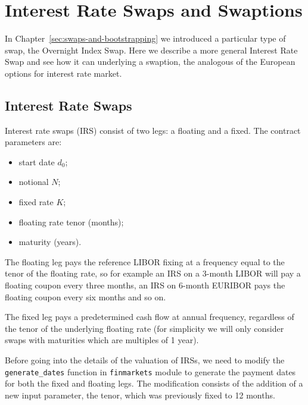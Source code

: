 \chapter{Interest Rate Swaps and Swaptions}
\label{interest-rate-swaps-and-swaptions}

In Chapter~\ref{sec:swaps-and-bootstrapping} we introduced a particular type of swap, the Overnight Index Swap. Here we describe a more general Interest Rate Swap and see how it can underlying a swaption, the analogous of the European options for interest rate market.

\section{Interest Rate Swaps}\label{interest-rate-swaps}

Interest rate swaps (IRS) consist of two legs: a floating and a fixed. The contract parameters are:

\begin{itemize}
\tightlist
\item
  start date \(d_0\);
\item
  notional \(N\);
\item
  fixed rate \(K\);
\item
  floating rate tenor (months);
\item
  maturity (years).
\end{itemize}

The floating leg pays the reference LIBOR fixing at a frequency equal to the tenor of the floating rate, so for example an IRS on a 3-month LIBOR will pay a floating coupon every three months, an IRS on 6-month EURIBOR pays the floating coupon every six months and so on.

The fixed leg pays a predetermined cash flow at annual frequency, regardless of the tenor of the underlying floating rate (for simplicity we will only consider swaps with maturities which are multiples of 1 year).

Before going into the details of the valuation of IRSs, we need to modify the \texttt{generate\_dates} function in \texttt{finmarkets} module to generate the payment dates for both the fixed and floating legs. 
The modification consists of the addition of a new input parameter, the tenor, which was previously fixed to 12 months.

